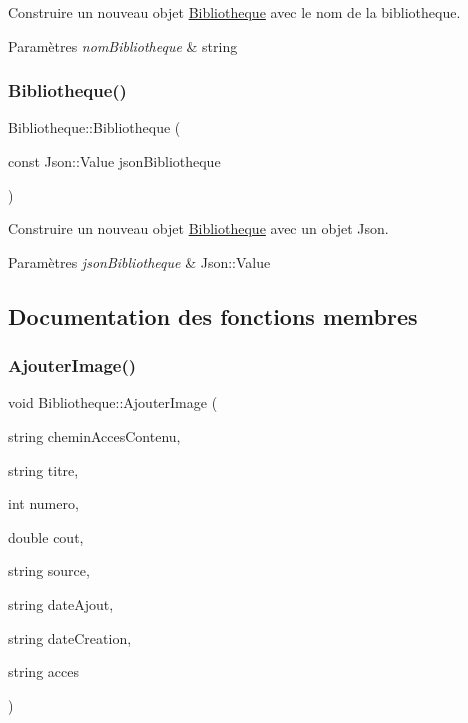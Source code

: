 Construire un nouveau objet \hyperlink{classBibliotheque}{Bibliotheque} avec le nom de la bibliotheque. 


\begin{DoxyParams}{Paramètres}
{\em nom\+Bibliotheque} & string \\
\hline
\end{DoxyParams}
\mbox{\label{classBibliotheque_abeef5fed51f37a993d77ba5af478051c}} 
\subsubsection{\texorpdfstring{Bibliotheque()}{Bibliotheque()}\hspace{0.1cm}{\footnotesize\ttfamily [2/2]}}
{\footnotesize\ttfamily Bibliotheque\+::\+Bibliotheque (\begin{DoxyParamCaption}\item[{const Json\+::\+Value}]{json\+Bibliotheque }\end{DoxyParamCaption})}



Construire un nouveau objet \hyperlink{classBibliotheque}{Bibliotheque} avec un objet Json. 


\begin{DoxyParams}{Paramètres}
{\em json\+Bibliotheque} & Json\+::\+Value \\
\hline
\end{DoxyParams}


\subsection{Documentation des fonctions membres}
\mbox{\label{classBibliotheque_a246e3a8893bb28b0d76845c624a1cd48}} 
\subsubsection{\texorpdfstring{Ajouter\+Image()}{AjouterImage()}}
{\footnotesize\ttfamily void Bibliotheque\+::\+Ajouter\+Image (\begin{DoxyParamCaption}\item[{string}]{chemin\+Acces\+Contenu,  }\item[{string}]{titre,  }\item[{int}]{numero,  }\item[{double}]{cout,  }\item[{string}]{source,  }\item[{string}]{date\+Ajout,  }\item[{string}]{date\+Creation,  }\item[{string}]{acces }\end{DoxyParamCaption})}



